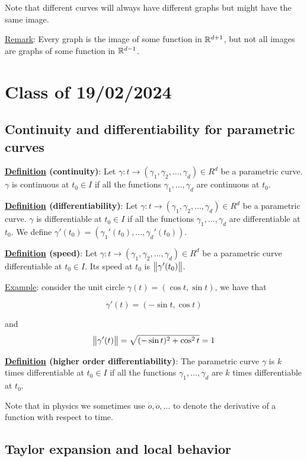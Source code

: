 \documentclass[10pt]{extarticle}
\begin{document}
Note that different curves will always have different graphs but might have the same image.

\underline{Remark}: Every graph is the image of some function in $\mathbb{R}^{d+1}$, but not all images are graphs of some function in $\mathbb{R}^{d-1}$.

\section{Class of 19/02/2024}

\subsection{Continuity and differentiability for parametric curves}

\textbf{\underline{Definition} (continuity)}: Let $\gamma: t \to (\gamma_1, \gamma_2, \ldots, \gamma_d) \in R^d$ be a parametric curve.
$\gamma$ is continuous at $t_0 \in I$ if all the functions $\gamma_1, \ldots, \gamma_d$ are continuous at $t_0$.

\textbf{\underline{Definition} (differentiability)}: Let $\gamma: t \to (\gamma_1, \gamma_2, \ldots, \gamma_d) \in R^d$ be a parametric curve.
$\gamma$ is differentiable at $t_0 \in I$ if all the functions $\gamma_1, \ldots, \gamma_d$ are differentiable at $t_0$.
We define $\gamma'(t_0) = (\gamma_1'(t_0), \ldots, \gamma_d'(t_0))$.

\textbf{\underline{Definition} (speed)}: Let $\gamma: t \to (\gamma_1, \gamma_2, \ldots, \gamma_d) \in R^d$ be a parametric curve differentiable at $t_0 \in I$.
Its speed at $t_0$ is $\norm{\gamma'(t_0)}$.

\underline{Example}: consider the unit circle $\gamma(t) = (\cos t, \sin t)$, we have that

$$
    \gamma'(t) = (-\sin t, \cos t)
$$

and
$$
    \norm{\gamma'(t)} = \sqrt{(-\sin t)^2 + \cos^2 t} = 1
$$

\textbf{\underline{Definition} (higher order differentiability)}:
The parametric curve $\gamma$ is $k$ times differentiable at $t_0 \in I$ if all the functions $\gamma_1, \ldots, \gamma_d$ are $k$ times differentiable at $t_0$.

Note that in physics we sometimes use $\dot{o}, \ddot{o}, \ldots$ to denote the derivative of a function with respect to time.

\subsection{Taylor expansion and local behavior}
\end{document}
